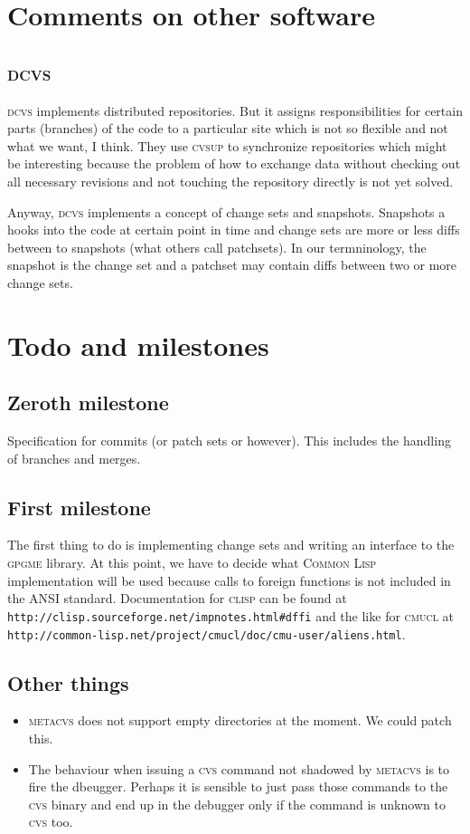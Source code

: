 \documentclass[fleqn, german, 10pt, a4paper]{article}
\begin{document}
\section{Comments on other software}

\subsection{\textsc{dcvs}}

\textsc{dcvs} implements distributed repositories. But it assigns
responsibilities for certain parts (branches) of the code to
a particular site which is not so flexible and not what we want, I think.
They use \textsc{cvsup} to synchronize repositories which might be
interesting because the problem of how to exchange data without checking
out all necessary revisions and not touching the repository directly is
not yet solved.
 
Anyway, \textsc{dcvs} implements a concept of change sets and snapshots.
Snapshots a hooks into the code at certain point in time and change sets
are more or less diffs between to snapshots (what others call patchsets).
In our termninology, the snapshot is the change set and a patchset may
contain diffs between two or more change sets.


\section{Todo and milestones}

\subsection{Zeroth milestone}
Specification for commits (or patch sets or however). This includes
the handling of branches and merges.

\subsection{First milestone}
The first thing to do is implementing change sets and writing an
interface to the \textsc{gpgme} library. At this point, we have to decide
what \textsc{Common Lisp} implementation will be used because calls
to foreign functions is not included in the ANSI standard.
Documentation for \textsc{clisp} can be found at
\texttt{http://clisp.sourceforge.net/impnotes.html\#dffi} and the like
for \textsc{cmucl} at \texttt{http://common-lisp.net/project/cmucl/doc/cmu-user/aliens.html}.

\subsection{Other things}
\begin{itemize}
\item \textsc{metacvs} does not support empty directories at the moment.
We could patch this.
\item The behaviour when issuing a \textsc{cvs} command not shadowed by
\textsc{metacvs} is to fire the dbeugger. Perhaps it is sensible to
just pass those commands to the \textsc{cvs} binary and end up in the debugger
only if the command is unknown to \textsc{cvs} too.
\end{itemize}
\end{document}
